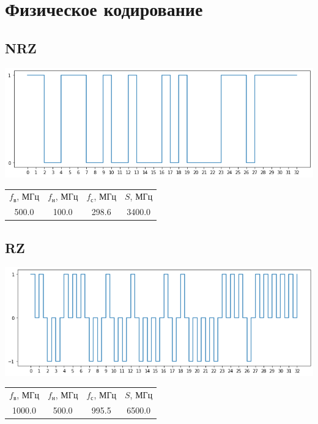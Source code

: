\section{Физическое кодирование}
\subsection{NRZ}
\includegraphics[width=\textwidth]{2nrz}
\begin{center}
    \begin{tabular}{cccc}
        $f_\mathrm{\text{в}}$, МГц & $f_\mathrm{\text{н}}$, МГц & $f_\mathrm{\text{с}}$, МГц & $S$, МГц \\
        500.0 & 100.0 & 298.6 & 3400.0 \\
    \end{tabular}
\end{center}

\subsection{RZ}
\includegraphics[width=\textwidth]{2rz}
\begin{center}
    \begin{tabular}{cccc}
        $f_\mathrm{\text{в}}$, МГц & $f_\mathrm{\text{н}}$, МГц & $f_\mathrm{\text{с}}$, МГц & $S$, МГц \\
        1000.0 & 500.0 & 995.5 & 6500.0 \\
    \end{tabular}
\end{center}

